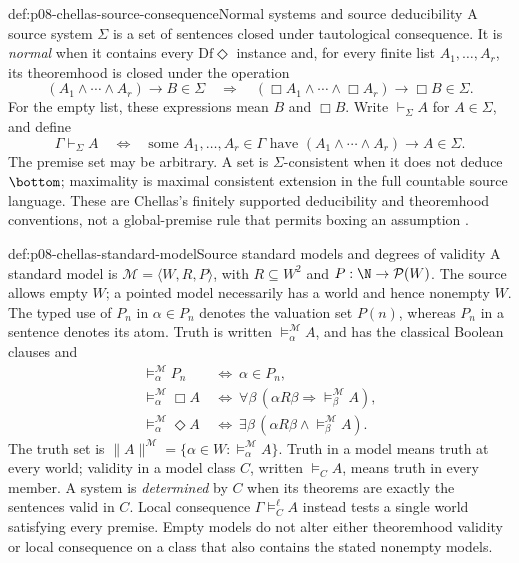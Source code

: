 \begin{hbdefinition}{def:p08-chellas-source-consequence}{Normal systems and source deducibility}
A source system \(\Sigma\) is a set of sentences closed under
tautological consequence. It is \emph{normal} when it contains every
\(\mathrm{Df}\Diamond\) instance and, for every finite list
\(A_1,\ldots,A_r\), its theoremhood is closed under the operation
\[
 (A_1\land\cdots\land A_r)\to B\in\Sigma
 \quad\Longrightarrow\quad
 (\Box A_1\land\cdots\land\Box A_r)\to\Box B\in\Sigma.
\]
For the empty list, these expressions mean \(B\) and \(\Box B\).
Write \(\vdash_\Sigma A\) for \(A\in\Sigma\), and define
\[
 \Gamma\vdash_\Sigma A
 \quad\Longleftrightarrow\quad
 \text{some }A_1,\ldots,A_r\in\Gamma\text{ have }
 (A_1\land\cdots\land A_r)\to A\in\Sigma.
\]
The premise set may be arbitrary. A set is \(\Sigma\)-consistent when
it does not deduce \(\bottom\); maximality is maximal consistent
extension in the full countable source language. These are Chellas's
finitely supported deducibility and theoremhood conventions, not a
global-premise rule that permits boxing an assumption
\cite[defs.~2.11--2.17, 4.1]{Chellas1980}.
\end{hbdefinition}

\begin{hbdefinition}{def:p08-chellas-standard-model}{Source standard models and degrees of validity}
A standard model is \(\mathcal M=\langle W,R,P\rangle\), with
\(R\subseteq W^2\) and \(P:\N\to\mathcal P(W)\).
The source allows empty \(W\); a pointed model necessarily has a
world and hence nonempty \(W\). The typed use of \(P_n\) in
\(\alpha\in P_n\) denotes the valuation set \(P(n)\), whereas
\(P_n\) in a sentence denotes its atom. Truth is written
\(\models_\alpha^{\mathcal M}A\), and has the classical Boolean
clauses and
\[
\begin{aligned}
 \models_\alpha^{\mathcal M}P_n&\ \Longleftrightarrow\ \alpha\in P_n,\\
 \models_\alpha^{\mathcal M}\Box A&\ \Longleftrightarrow\
       \forall\beta\,(\alpha R\beta\Rightarrow
                     \models_\beta^{\mathcal M}A),\\
 \models_\alpha^{\mathcal M}\Diamond A&\ \Longleftrightarrow\
       \exists\beta\,(\alpha R\beta\land
                     \models_\beta^{\mathcal M}A).
\end{aligned}
\]
The truth set is \(\|A\|^{\mathcal M}=\{\alpha\in W:
\models_\alpha^{\mathcal M}A\}\). Truth in a model means truth at
every world; validity in a model class \(C\), written \(\models_C A\),
means truth in every member. A system is \emph{determined} by \(C\)
when its theorems are exactly the sentences valid in \(C\).
Local consequence \(\Gamma\models_C^\ell A\) instead tests a
single world satisfying every premise. Empty models do not alter either
theoremhood validity or local consequence on a class that also contains
the stated nonempty models.
\end{hbdefinition}

